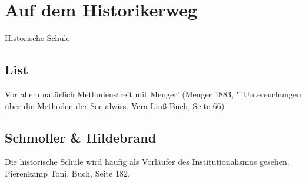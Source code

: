 %
%
%

\chapter{Auf dem Historikerweg}
\label{Historisch}
Historische Schule

\section{List}
Vor allem natürlich Methodenstreit mit Menger! (Menger 1883, "`Untersuchungen über die Methoden der Socialwiss. Vera Linß-Buch, Seite 66)

\section{Schmoller \& Hildebrand}

Die historische Schule wird häufig als Vorläufer des Institutionalismus gesehen.
Pierenkamp Toni, Buch, Seite 182.